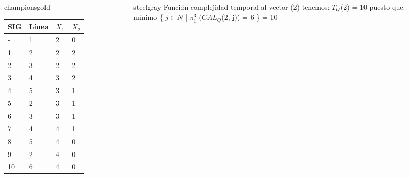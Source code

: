 \documentclass[xcolor=table]{beamer}
\begin{document}
\begin{frame}[fragile]
\begin{columns}
    \begin{column}{0.5\textwidth}
        \begin{colorblock}[black]{championsgold}{}\tiny
            \begin{table}[]
            \begin{tabular}{|l|l|l|l|}
            \hline\tiny
            \textbf{SIG} & \textbf{Línea} & \textbf{$X_1$} & \textbf{$X_2$} \\ \hline
            -                  & 1              & 2           & 0           \\ \hline
            1                  & 2              & 2           & 2           \\ \hline
            2                  & 3              & 2           & 2           \\ \hline
            3                  & 4              & 3           & 2           \\ \hline
            4                  & 5              & 3           & 1           \\ \hline
            5                  & 2              & 3           & 1           \\ \hline
            6                  & 3              & 3           & 1           \\ \hline
            7                  & 4              & 4           & 1           \\ \hline
            8                  & 5              & 4           & 0           \\ \hline
            9                  & 2              & 4           & 0           \\ \hline
            10                 & 6              & 4           & 0           \\ \hline
            \end{tabular}
            \end{table}
        \end{colorblock}
        \end{column}

    \begin{column}{0.43\textwidth}
        \begin{colorblock}[white]{steelgray}{}\scriptsize
           Función complejidad temporal al vector (2) tenemos: $T_Q$(2) = 10
            puesto que:\\
            mínimo \{ $j \in N$ | $\pi_1^3$ ($CAL_Q$(2, j)) = 6 \} = 10
            \end{colorblock}
    \end{column}


\end{columns}

\end{frame}
\end{document}
